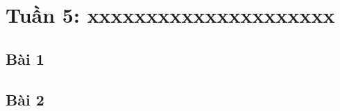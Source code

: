\documentclass{article}
\begin{document}
\tableofcontents
\newpage
\listoffigures
\newpage
\section{Tuần 5: xxxxxxxxxxxxxxxxxxxxx}
\subsection{Bài 1}


\subsection{Bài 2}


\end{document}
